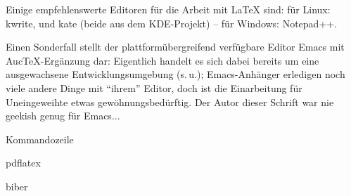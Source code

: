 Einige empfehlenswerte Editoren für die Arbeit mit \LaTeX{} sind:
für Linux: kwrite,  und kate (beide aus dem KDE-Projekt) --
für Windows: Notepad++.

Einen Sonderfall stellt der plattformübergreifend verfügbare Editor Emacs mit AucTeX-Ergänzung
dar: Eigentlich handelt es sich dabei bereits um eine ausgewachsene Entwicklungsumgebung (s.\,u.);
Emacs-Anhänger erledigen noch viele andere Dinge mit \enquote{ihrem} Editor, doch ist die 
Einarbeitung für Uneingeweihte etwas gewöhnungsbedürftig.
Der Autor dieser Schrift war nie geekish genug für Emacs...

Kommandozeile

pdflatex

biber



